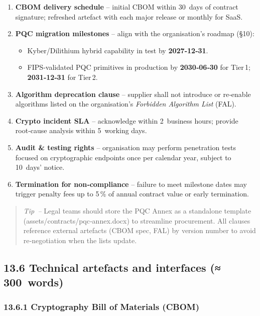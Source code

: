 \documentclass[
  english,
]{article}
\providecommand{\tightlist}{%
  \setlength{\itemsep}{0pt}\setlength{\parskip}{0pt}}
\begin{document}
\begin{enumerate}
\def\labelenumi{\arabic{enumi}.}
\tightlist
\item
  \textbf{CBOM delivery schedule} -- initial CBOM within 30~days of
  contract signature; refreshed artefact with each major release or
  monthly for SaaS.
\item
  \textbf{PQC migration milestones} -- align with the organisation's
  roadmap (§10):

  \begin{itemize}
  \tightlist
  \item
    Kyber/Dilithium hybrid capability in test by \textbf{2027‑12‑31}.
  \item
    FIPS‑validated PQC primitives in production by \textbf{2030‑06‑30}
    for Tier\,1; \textbf{2031‑12‑31} for Tier\,2.
  \end{itemize}
\item
  \textbf{Algorithm deprecation clause} -- supplier shall not introduce
  or re‑enable algorithms listed on the organisation's \emph{Forbidden
  Algorithm List} (FAL).
\item
  \textbf{Crypto incident SLA} -- acknowledge within 2~business hours;
  provide root‑cause analysis within 5~working days.
\item
  \textbf{Audit \& testing rights} -- organisation may perform
  penetration tests focused on cryptographic endpoints once per calendar
  year, subject to 10~days' notice.
\item
  \textbf{Termination for non‑compliance} -- failure to meet milestone
  dates may trigger penalty fees up to 5\,\% of annual contract value or
  early termination.
\end{enumerate}

\begin{quote}
\emph{Tip~--} Legal teams should store the PQC Annex as a standalone
template (assets/contracts/pqc‑annex.docx) to streamline procurement.
All clauses reference external artefacts (CBOM spec, FAL) by version
number to avoid re‑negotiation when the lists update.
\end{quote}

\subsection{13.6 Technical artefacts and interfaces
(≈\,300~words)}\label{technical-artefacts-and-interfaces-300-words}

\subsubsection{13.6.1 Cryptography Bill of Materials
(CBOM)}\label{cryptography-bill-of-materials-cbom}
\end{document}
